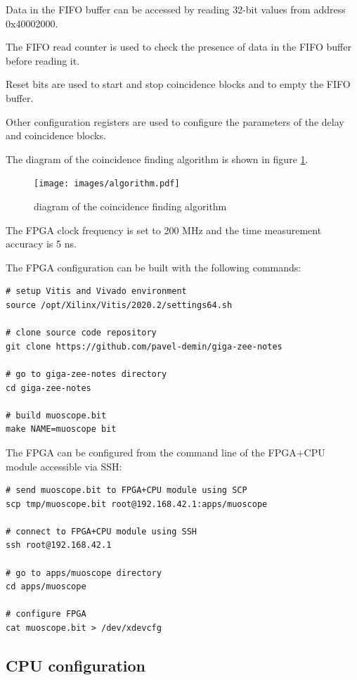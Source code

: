 \documentclass[12pt, a4paper]{article}
\begin{document}
Data in the FIFO buffer can be accessed by reading 32-bit values from address 0x40002000.

The FIFO read counter is used to check the presence of data in the FIFO buffer before reading it.

Reset bits are used to start and stop coincidence blocks and to empty the FIFO buffer.

Other configuration registers are used to configure the parameters of the delay and coincidence blocks.

The diagram of the coincidence finding algorithm is shown in figure \ref{fig:algorithm}.

\begin{figure}[h!]
  \centering
  \texttt{[image: images/algorithm.pdf]}
  \caption{diagram of the coincidence finding algorithm}
  \label{fig:algorithm}
\end{figure}

The FPGA clock frequency is set to 200 MHz and the time measurement accuracy is 5 ns.

The FPGA configuration can be built with the following commands:
\vspace{-1ex}
\begin{verbatim}
# setup Vitis and Vivado environment
source /opt/Xilinx/Vitis/2020.2/settings64.sh

# clone source code repository
git clone https://github.com/pavel-demin/giga-zee-notes

# go to giga-zee-notes directory
cd giga-zee-notes

# build muoscope.bit
make NAME=muoscope bit
\end{verbatim}

The FPGA can be configured from the command line of the FPGA+CPU module accessible via SSH:
\vspace{-1ex}
\begin{verbatim}
# send muoscope.bit to FPGA+CPU module using SCP
scp tmp/muoscope.bit root@192.168.42.1:apps/muoscope

# connect to FPGA+CPU module using SSH
ssh root@192.168.42.1

# go to apps/muoscope directory
cd apps/muoscope

# configure FPGA
cat muoscope.bit > /dev/xdevcfg
\end{verbatim}

\subsection{CPU configuration}
\end{document}
